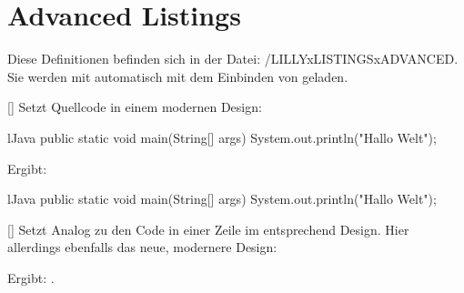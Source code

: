 \section{Advanced Listings}

Diese Definitionen befinden sich in der Datei: {\ltt{}/LILLYxLISTINGSxADVANCED}. Sie werden mit  automatisch mit dem Einbinden von  geladen.

[]
Setzt Quellcode in einem modernen Design:
\begin{latex}
\begin{presentlst}{lJava}
public static void main(String[] args) {
    System.out.println("Hallo Welt");
}
\end{presentlst}
\end{latex}
Ergibt:
\begin{presentlst}{lJava}
public static void main(String[] args) {
    System.out.println("Hallo Welt");
}
\end{presentlst}

[]
Setzt Analog zu  den Code in einer Zeile im entsprechend Design. Hier allerdings ebenfalls das neue, modernere Design:
\begin{latex}
\end{latex}
Ergibt: .



% 
% 






